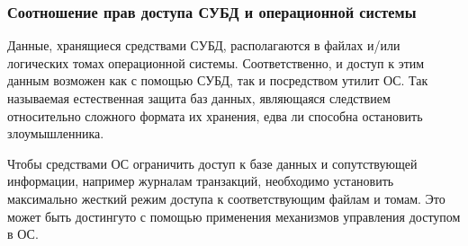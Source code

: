 \subsubsection{Соотношение прав доступа СУБД и операционной системы}

Данные, хранящиеся средствами СУБД, располагаются в файлах и/или логических томах операционной
системы. Соответственно, и доступ к этим данным возможен как с помощью СУБД, так и посредством
утилит ОС. Так называемая естественная защита баз данных, являющаяся следствием относительно
сложного формата их хранения, едва ли способна остановить злоумышленника.

Чтобы средствами ОС ограничить доступ к базе данных и сопутствующей информации,
например журналам транзакций, необходимо установить максимально жесткий режим доступа к
соответствующим файлам и томам. Это может быть достингуто с помощью применения механизмов
управления доступом в ОС.

